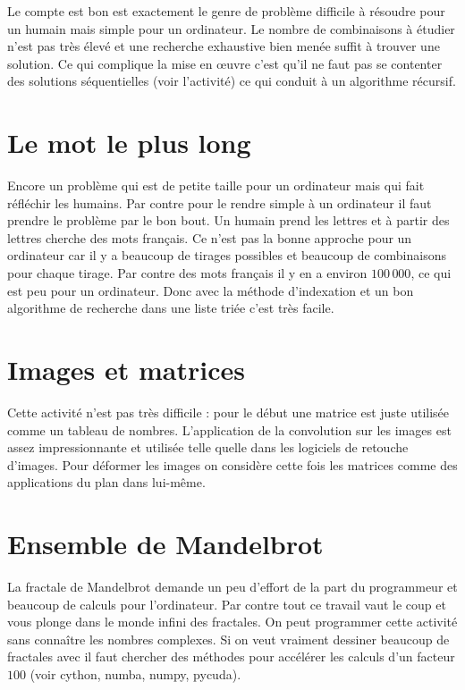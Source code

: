 \documentclass[11pt,class=report,crop=false]{standalone}
\begin{document}
\og{}Le compte est bon\fg{} est exactement le genre de problème difficile à résoudre pour un humain mais simple pour un ordinateur. Le nombre de combinaisons à étudier n'est pas très élevé et une recherche exhaustive bien menée suffit à trouver une solution. Ce qui complique la mise en \oe uvre c'est qu'il ne faut pas se contenter des solutions séquentielles (voir l'activité) ce qui conduit à un algorithme récursif. 


\section{Le mot le plus long}

Encore un problème qui est de petite taille pour un ordinateur mais qui fait réfléchir les humains. Par contre pour le rendre simple à un ordinateur il faut prendre le problème par le bon bout. Un humain prend les lettres et à partir des lettres cherche des mots français. Ce n'est pas la bonne approche pour un ordinateur car il y a beaucoup de tirages possibles et beaucoup de combinaisons pour chaque tirage. Par contre des mots français il y en a environ $100\, 000$, ce qui est peu pour un ordinateur. Donc avec la méthode d'indexation et un bon algorithme de recherche dans une liste triée c'est très facile.



\section{Images et matrices}

Cette activité n'est pas très difficile : pour le début une matrice est juste utilisée comme un tableau de nombres. L'application de la convolution sur les images est assez impressionnante et utilisée telle quelle dans les logiciels de retouche d'images. Pour déformer les images on considère cette fois les matrices comme des applications du plan dans lui-même.



\section{Ensemble de Mandelbrot}

La fractale de Mandelbrot demande un peu d'effort de la part du programmeur et beaucoup de calculs pour l'ordinateur. Par contre tout ce travail vaut le coup et vous plonge dans le monde infini des fractales. On peut programmer cette activité sans connaître les nombres complexes.
Si on veut vraiment dessiner beaucoup de fractales avec \Python{} il faut chercher des méthodes pour accélérer les calculs d'un facteur $100$ (voir cython, numba, numpy, pycuda).
\end{document}
